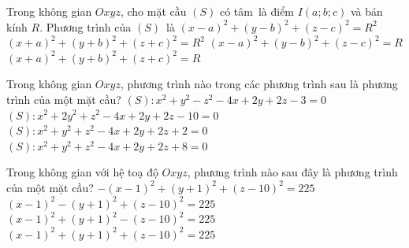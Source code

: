 

\begin{ex}%
	Trong không gian $Oxyz$, cho mặt cầu $(S)$ có tâm~là điểm $I(a; b; c)$ và bán kính  $R$. Phương trình của $(S)$~là
	 \choice
		{\True $(x-a)^2 + (y-b)^2 +  (z-c)^2 =R^2$}
		{$(x+a)^2 + (y+b)^2 + (z+c)^2  =R^2$}
		{$(x-a)^2 + (y-b)^2  + (z-c)^2 =R$}
		{$(x+a)^2 + (y+b)^2  + (z+c)^2 =R$}
\end{ex}

\begin{ex}%
	Trong không gian $Oxyz$, phương trình nào trong các phương trình sau  là phương trình của một mặt cầu?
	 \choice
		{$(S)\colon x^2+y^2-z^2-4x+2y+2z-3=0$} 
		{$(S)\colon  x^2+2y^2+z^2-4x+2y+2z-10=0$}
		{\True $(S)\colon  x^2+y^2+z^2-4x+2y+2z+2=0$}
		 {$(S)\colon x^2+y^2+z^2-4x+2y+2z+8=0$}
\end{ex}

\begin{ex}%
	Trong  không gian với hệ toạ độ $Oxyz$, phương trình nào sau đây là phương trình của một mặt cầu?
	 \choice
		{$-(x-1)^2+(y+1)^2+(z-10)^2=225$} 
		{$(x-1)^2-(y+1)^2+(z-10)^2=225$} 
		 {$(x-1)^2+(y+1)^2-(z-10)^2=225$}
		 {\True $(x-1)^2+(y+1)^2+(z-10)^2=225$}
\end{ex}

